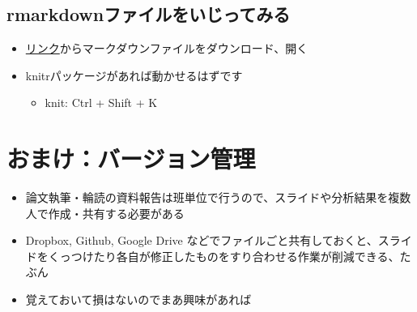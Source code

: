 \documentclass[
]{ltjsarticle}
\providecommand{\tightlist}{%
  \setlength{\itemsep}{0pt}\setlength{\parskip}{0pt}}
\begin{document}
\hypertarget{rmarkdownux30d5ux30a1ux30a4ux30ebux3092ux3044ux3058ux3063ux3066ux307fux308b}{%
\subsection{rmarkdownファイルをいじってみる}\label{rmarkdownux30d5ux30a1ux30a4ux30ebux3092ux3044ux3058ux3063ux3066ux307fux308b}}

\begin{itemize}
\tightlist
\item
  \href{https://raw.githubusercontent.com/T-Reio/r_introduction/main/rmarkdown_to_docx.Rmd}{リンク}からマークダウンファイルをダウンロード、開く
\item
  knitrパッケージがあれば動かせるはずです

  \begin{itemize}
  \tightlist
  \item
    knit: Ctrl + Shift + K
  \end{itemize}
\end{itemize}

\hypertarget{ux304aux307eux3051ux30d0ux30fcux30b8ux30e7ux30f3ux7ba1ux7406}{%
\section{おまけ：バージョン管理}\label{ux304aux307eux3051ux30d0ux30fcux30b8ux30e7ux30f3ux7ba1ux7406}}

\begin{itemize}
\tightlist
\item
  論文執筆・輪読の資料報告は班単位で行うので、スライドや分析結果を複数人で作成・共有する必要がある
\item
  Dropbox, Github, Google Drive
  などでファイルごと共有しておくと、スライドをくっつけたり各自が修正したものをすり合わせる作業が削減できる、たぶん
\item
  覚えておいて損はないのでまあ興味があれば
\end{itemize}
\end{document}
